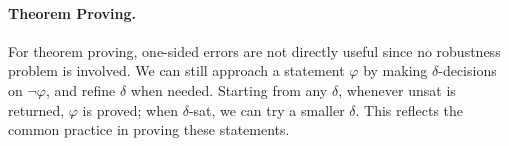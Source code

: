 \documentclass[envcountsect]{llncs}
\begin{document}
\paragraph{Theorem Proving.} For theorem proving, one-sided errors are not directly useful since no robustness problem is involved. We can still approach a statement $\varphi$ by making $\delta$-decisions on $\neg\varphi$, and refine $\delta$ when needed. Starting from any $\delta$, whenever {\sf unsat} is returned, $\varphi$ is proved; when {\sf $\delta$-sat}, we can try a smaller $\delta$. This reflects the common practice in proving these statements. 

\end{document}
